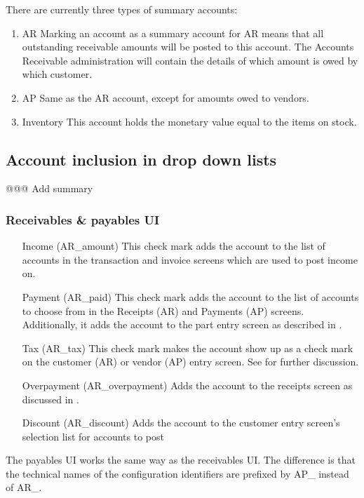 There are currently three types of summary accounts:

\begin{enumerate}
\item AR Marking an account as a summary account for AR means that all outstanding
   receivable amounts will be posted to this account. The Accounts Receivable administration
   will contain the details of which amount is owed by which customer.
\item AP Same as the AR account, except for amounts owed to vendors.
\item Inventory This account holds the monetary value equal to the items on stock.
\end{enumerate}

\subsection{Account inclusion in drop down lists}

@@@ Add summary

\subsubsection{Receivables \& payables UI}
\label{subsec:AR-AP-checkmarks}

\begin{itemize}
\item[Income (AR\_amount)] This check mark adds the account to the list of accounts
   in the transaction and invoice screens which are used to post income on.
\item[Payment (AR\_paid)] This check mark adds the account to the list of accounts
   to choose from in the Receipts (AR) and Payments (AP) screens. Additionally, it
   adds the account to the part entry screen as described in .
\item[Tax (AR\_tax)] This check mark makes the account show up as a check mark on the
   customer (AR) or vendor (AP) entry screen. See  for further discussion.
\item[Overpayment (AR\_overpayment)] Adds the account to the receipts screen as discussed
   in .
\item[Discount (AR\_discount)] Adds the account to the customer entry screen's selection
   list for accounts to post 
\end{itemize}

The payables UI works the same way as the receivables UI. The difference is
that the technical names of the configuration identifiers are prefixed by AP\_ instead
of AR\_.

